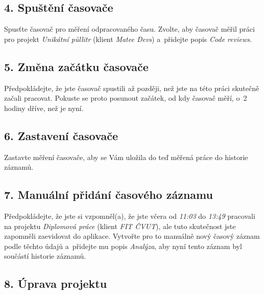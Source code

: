 \subsection*{4. Spuštění časovače}

Spusťte časovač pro měření odpracovaného času. Zvolte, aby časovač měřil práci pro projekt \emph{Unikátní půllitr} (klient \emph{Matee Devs}) a~přidejte popis \emph{Code reviews}.

\subsection*{5. Změna začátku časovače}

Předpokládejte, že jste časovač spustili až později, než jste na této práci skutečně začali pracovat. Pokuste se proto posunout začátek, od kdy časovač měří, o~2 hodiny dříve, než je nyní.

\subsection*{6. Zastavení časovače}

Zastavte měření časovače, aby se Vám uložila do teď měřená práce do historie záznamů.

\subsection*{7. Manuální přidání časového záznamu}

Předpokládejte, že jste si vzpomněl(a), že jste včera od \emph{11:03} do \emph{13:49} pracovali na projektu \emph{Diplomová práce} (klient \emph{FIT ČVUT}), ale tuto skutečnost jste zapomněli zaevidovat do aplikace. Vytvořte pro to manuálně nový časový záznam podle těchto údajů a~přidejte mu popis \emph{Analýza}, aby nyní tento záznam byl součástí historie záznamů.

\subsection*{8. Úprava projektu}

